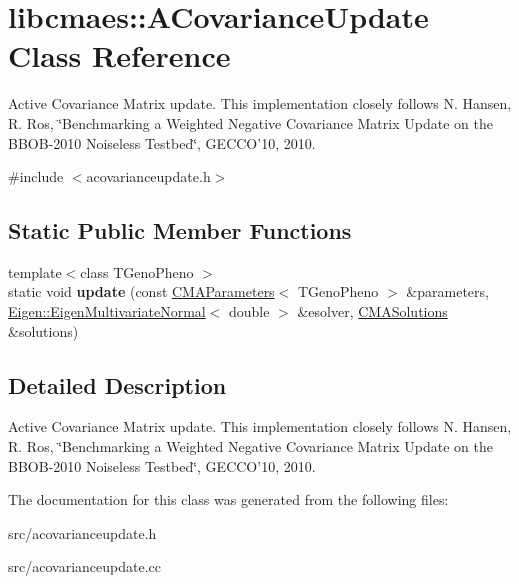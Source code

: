 \hypertarget{classlibcmaes_1_1ACovarianceUpdate}{\section{libcmaes\-:\-:A\-Covariance\-Update Class Reference}
\label{classlibcmaes_1_1ACovarianceUpdate}
}


Active Covariance Matrix update. This implementation closely follows N. Hansen, R. Ros, \char`\"{}\-Benchmarking a Weighted Negative Covariance Matrix 
                           Update on the B\-B\-O\-B-\/2010 Noiseless Testbed\char`\"{}, G\-E\-C\-C\-O'10, 2010.  




{\ttfamily \#include $<$acovarianceupdate.\-h$>$}

\subsection*{Static Public Member Functions}
\begin{DoxyCompactItemize}
\item 
\hypertarget{classlibcmaes_1_1ACovarianceUpdate_a87c39fb576507d536d98162209154727}{{\footnotesize template$<$class T\-Geno\-Pheno $>$ }\\static void {\bfseries update} (const \hyperlink{classlibcmaes_1_1CMAParameters}{C\-M\-A\-Parameters}$<$ T\-Geno\-Pheno $>$ \&parameters, \hyperlink{classEigen_1_1EigenMultivariateNormal}{Eigen\-::\-Eigen\-Multivariate\-Normal}$<$ double $>$ \&esolver, \hyperlink{classlibcmaes_1_1CMASolutions}{C\-M\-A\-Solutions} \&solutions)}\label{classlibcmaes_1_1ACovarianceUpdate_a87c39fb576507d536d98162209154727}

\end{DoxyCompactItemize}


\subsection{Detailed Description}
Active Covariance Matrix update. This implementation closely follows N. Hansen, R. Ros, \char`\"{}\-Benchmarking a Weighted Negative Covariance Matrix 
                           Update on the B\-B\-O\-B-\/2010 Noiseless Testbed\char`\"{}, G\-E\-C\-C\-O'10, 2010. 

The documentation for this class was generated from the following files\-:\begin{DoxyCompactItemize}
\item 
src/acovarianceupdate.\-h\item 
src/acovarianceupdate.\-cc\end{DoxyCompactItemize}

